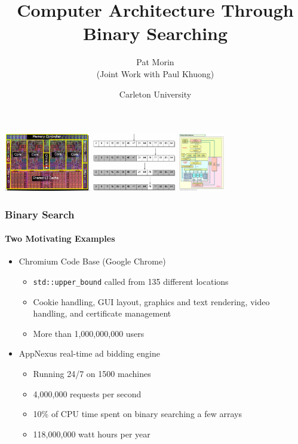 \documentclass[xcolor=dvipsnames]{beamer}
\title{Computer Architecture Through Binary Searching}
\author{Pat Morin \\ (Joint Work with Paul Khuong)}
\date{Carleton University}
\begin{document}
\begin{frame}
  \titlepage
  \centerline{
    \includegraphics[height=1in]{images/nehalemdie}
    \includegraphics[height=1in]{images/binary-search}
    \includegraphics[height=1in]{images/nehalem-block}
  }
\end{frame}


\begin{frame}
  \frametitle{Binary Search}
  \framesubtitle{Two Motivating Examples}

  \begin{itemize}[<+->]
    \item Chromium Code Base (Google Chrome)
    \begin{itemize}
       \item \texttt{std::upper_bound} called from 135 different locations
       \item Cookie handling, GUI layout, graphics and text rendering, video handling, and certificate management
       \item More than 1,000,000,000 users
    \end{itemize}
    \item AppNexus real-time ad bidding engine
    \begin{itemize}
       \item Running 24/7 on 1500 machines
       \item 4,000,000 requests per second
       \item 10\% of CPU time spent on binary searching a few arrays
       \item 118,000,000 watt hours per year
    \end{itemize}
  \end{itemize}
\end{frame}
\end{document}
